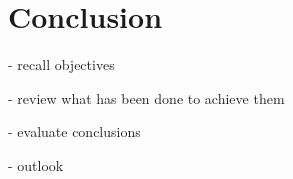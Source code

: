 % 

\part*{Conclusion}\label{conclusion}

- recall objectives

- review what has been done to achieve them

- evaluate conclusions

- outlook

